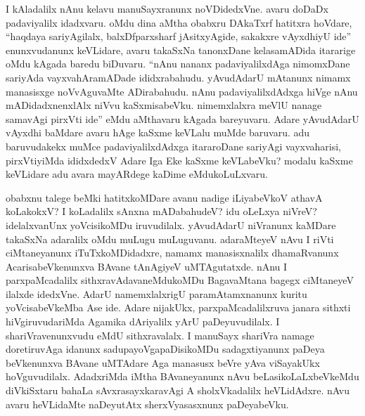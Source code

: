 I kAladalilx nAnu kelavu manuSayxranunx noVDidedxVne. avaru doDaDx padaviyalilx idadxvaru. oMdu dina aMtha obabxru DAkaTxrf hatitxra hoVdare, ``haqdaya sariyAgilalx, balxDfparxsharf jAsitxyAgide, sakakxre vAyxdhiyU ide'' enunxvudanunx keVLidare, avaru takaSxNa tanonxDane kelasamADida itararige oMdu kAgada baredu biDuvaru. ``nAnu nananx padaviyalilxdAga nimomxDane sariyAda vayxvahAramADade ididxrabahudu. yAvudAdarU mAtanunx nimamx manasisxge noVvAguvaMte ADirabahudu. nAnu padaviyalilxdAdxga hiVge nAnu mADidadxnenxlAlx niVvu kaSxmisabeVku. nimemxlalxra meVlU nanage samavAgi pirxVti ide'' eMdu aMthavaru kAgada bareyuvaru. Adare yAvudAdarU vAyxdhi baMdare avaru hAge kaSxme keVLalu muMde baruvaru. adu baruvudakekx muMce padaviyalilxdAdxga itararoDane sariyAgi vayxvaharisi, pirxVtiyiMda ididxdedxV Adare Iga Eke kaSxme keVLabeVku? modalu kaSxme keVLidare adu avara mayARdege kaDime eMdukoLuLxvaru.

obabxnu talege beMki hatitxkoMDare avanu nadige iLiyabeVkoV athavA koLakokxV? I koLadalilx sAnxna mADabahudeV? idu oLeLxya niVreV? idelalxvanUnx yoVcisikoMDu iruvudilalx. yAvudAdarU niVranunx kaMDare takaSxNa adaralilx oMdu muLugu muLuguvanu. adaraMteyeV nAvu I riVti ciMtaneyanunx iTuTxkoMDidadxre, namamx manasisxnalilx dhamaRvanunx AcarisabeVkenunxva BAvane tAnAgiyeV uMTAgutatxde. nAnu I parxpaMcadalilx sithxravAdavaneMdukoMDu BagavaMtana bagegx ciMtaneyeV ilalxde idedxVne. AdarU namemxlalxrigU paramAtamxnanunx kuritu yoVcisabeVkeMba Ase ide. Adare nijakUkx, parxpaMcadalilxruva janara sithxti hiVgiruvudariMda Agamika dAriyalilx yArU paDeyuvudilalx. I shariVravenunxvudu eMdU sithxravalalx. I manuSayx shariVra namage doretiruvAga idanunx sadupayoVgapaDisikoMDu sadagxtiyanunx paDeya beVkenunxva BAvane uMTAdare Aga manasusx beVre yAva viSayakUkx hoVguvudilalx. AdadxriMda iMtha BAvaneyanunx nAvu beLasikoLaLxbeVkeMdu diVkiSxtaru bahaLa sAvxrasayxkaravAgi A sholxVkadalilx heVLidAdxre. nAvu avaru heVLidaMte naDeyutAtx sherxVyasasxnunx paDeyabeVku.



\endchapter
